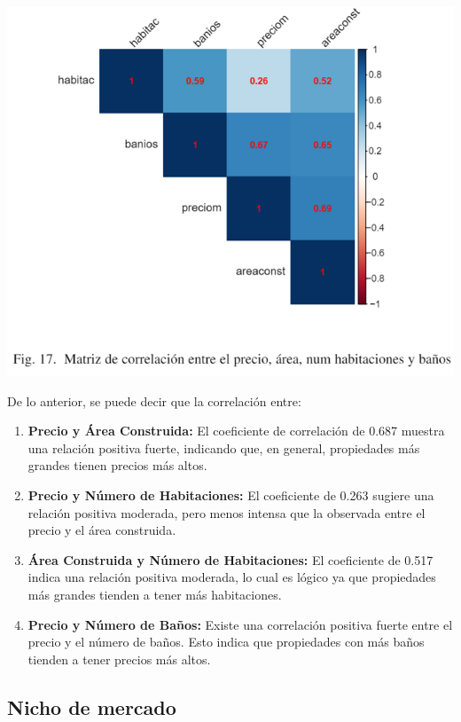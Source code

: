 \documentclass[conference,final,]{IEEEtran}
\begin{document}
\includegraphics[width=1\linewidth]{images/MatrizCorrelacion}

De lo anterior, se puede decir que la correlación entre:

\begin{enumerate}
\def\labelenumi{\arabic{enumi}.}
\item
  \textbf{Precio y Área Construida:} El coeficiente de correlación de
  0.687 muestra una relación positiva fuerte, indicando que, en general,
  propiedades más grandes tienen precios más altos.
\item
  \textbf{Precio y Número de Habitaciones:} El coeficiente de 0.263
  sugiere una relación positiva moderada, pero menos intensa que la
  observada entre el precio y el área construida.
\item
  \textbf{Área Construida y Número de Habitaciones:} El coeficiente de
  0.517 indica una relación positiva moderada, lo cual es lógico ya que
  propiedades más grandes tienden a tener más habitaciones.
\item
  \textbf{Precio y Número de Baños:} Existe una correlación positiva
  fuerte entre el precio y el número de baños. Esto indica que
  propiedades con más baños tienden a tener precios más altos.
\end{enumerate}

\subsection{\textbf{Nicho de mercado}}
\end{document}
